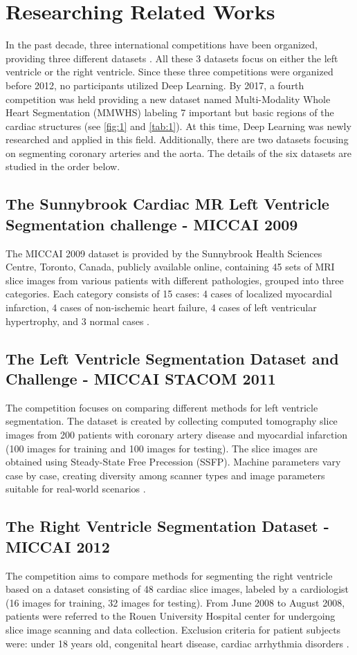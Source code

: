 \documentclass{article}
\begin{document}
\section{Researching Related Works}
In the past decade, three international competitions have been organized, providing three different datasets \cite{short_axis, left_ventricle, right_ventricle}. All these 3 datasets focus on either the left ventricle or the right ventricle. Since these three competitions were organized before 2012, no participants utilized Deep Learning. By 2017, a fourth competition was held providing a new dataset named Multi-Modality Whole Heart Segmentation (MMWHS) labeling 7 important but basic regions of the cardiac structures  (see \ref{fig:1} and \ref{tab:1}). At this time, Deep Learning was newly researched and applied in this field. Additionally, there are two datasets focusing on segmenting coronary arteries and the aorta. The details of the six datasets are studied in the order below.

\subsection{The Sunnybrook Cardiac MR Left Ventricle Segmentation challenge - MICCAI 2009}
The MICCAI 2009 dataset is provided by the Sunnybrook Health Sciences Centre, Toronto, Canada, publicly available online, containing 45 sets of MRI slice images from various patients with different pathologies, grouped into three categories. Each category consists of 15 cases: 4 cases of localized myocardial infarction, 4 cases of non-ischemic heart failure, 4 cases of left ventricular hypertrophy, and 3 normal cases \cite{short_axis, deformable}.

\subsection{The Left Ventricle Segmentation Dataset and Challenge - MICCAI STACOM 2011}
The competition focuses on comparing different methods for left ventricle segmentation. The dataset is created by collecting computed tomography slice images from 200 patients with coronary artery disease and myocardial infarction (100 images for training and 100 images for testing). The slice images are obtained using Steady-State Free Precession (SSFP). Machine parameters vary case by case, creating diversity among scanner types and image parameters suitable for real-world scenarios \cite{left_ventricle}.

\subsection{The Right Ventricle Segmentation Dataset - MICCAI 2012}
The competition aims to compare methods for segmenting the right ventricle based on a dataset consisting of 48 cardiac slice images, labeled by a cardiologist (16 images for training, 32 images for testing). From June 2008 to August 2008, patients were referred to the Rouen University Hospital center for undergoing slice image scanning and data collection. Exclusion criteria for patient subjects were: under 18 years old, congenital heart disease, cardiac arrhythmia disorders \cite{right_ventricle}.
\end{document}
